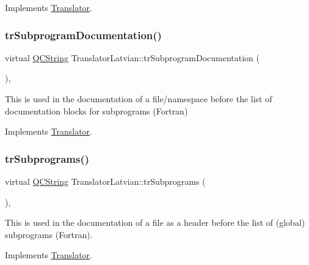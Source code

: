 Implements \mbox{\hyperlink{class_translator}{Translator}}.

\mbox{\label{class_translator_latvian_afc484bd38a979840ce6a8b103c1897e8}} 
\subsubsection{\texorpdfstring{trSubprogramDocumentation()}{trSubprogramDocumentation()}}
{\footnotesize\ttfamily virtual \mbox{\hyperlink{class_q_c_string}{Q\+C\+String}} Translator\+Latvian\+::tr\+Subprogram\+Documentation (\begin{DoxyParamCaption}{ }\end{DoxyParamCaption})\hspace{0.3cm}{\ttfamily [inline]}, {\ttfamily [virtual]}}

This is used in the documentation of a file/namespace before the list of documentation blocks for subprograms (Fortran) 

Implements \mbox{\hyperlink{class_translator}{Translator}}.

\mbox{\label{class_translator_latvian_a290521476148cedf4f9f19763d2f8767}} 
\subsubsection{\texorpdfstring{trSubprograms()}{trSubprograms()}}
{\footnotesize\ttfamily virtual \mbox{\hyperlink{class_q_c_string}{Q\+C\+String}} Translator\+Latvian\+::tr\+Subprograms (\begin{DoxyParamCaption}{ }\end{DoxyParamCaption})\hspace{0.3cm}{\ttfamily [inline]}, {\ttfamily [virtual]}}

This is used in the documentation of a file as a header before the list of (global) subprograms (Fortran). 

Implements \mbox{\hyperlink{class_translator}{Translator}}.

\mbox{\label{class_translator_latvian_a41f737a605fbd032fa299d9c8b1ad5dc}} 
